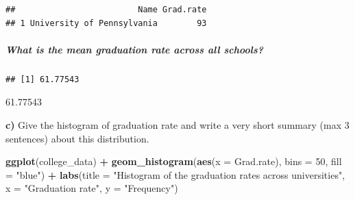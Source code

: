 \documentclass[]{article}
\newenvironment{Shaded}{\begin{snugshade}}{\end{snugshade}}
\newcommand{\KeywordTok}[1]{\textcolor[rgb]{0.13,0.29,0.53}{\textbf{#1}}}
\newcommand{\DataTypeTok}[1]{\textcolor[rgb]{0.13,0.29,0.53}{#1}}
\newcommand{\DecValTok}[1]{\textcolor[rgb]{0.00,0.00,0.81}{#1}}
\newcommand{\StringTok}[1]{\textcolor[rgb]{0.31,0.60,0.02}{#1}}
\newcommand{\CommentTok}[1]{\textcolor[rgb]{0.56,0.35,0.01}{\textit{#1}}}
\newcommand{\OperatorTok}[1]{\textcolor[rgb]{0.81,0.36,0.00}{\textbf{#1}}}
\newcommand{\NormalTok}[1]{#1}
\let\oldsubparagraph\subparagraph
\renewcommand{\subparagraph}[1]{\oldsubparagraph{#1}\mbox{}}
\begin{document}
\begin{verbatim}
##                         Name Grad.rate
## 1 University of Pennsylvania        93
\end{verbatim}

\subparagraph{What is the mean graduation rate across all
schools?}\label{what-is-the-mean-graduation-rate-across-all-schools}

\begin{Shaded}
\end{Shaded}

\begin{verbatim}
## [1] 61.77543
\end{verbatim}

\begin{Shaded}
\end{Shaded}

61.77543

\textbf{c)} Give the histogram of graduation rate and write a very short
summary (max 3 sentences) about this distribution.

\begin{Shaded}
\begin{Highlighting}[]
\KeywordTok{ggplot}\NormalTok{(college_data) }\OperatorTok{+}\StringTok{ }\KeywordTok{geom_histogram}\NormalTok{(}\KeywordTok{aes}\NormalTok{(}\DataTypeTok{x =}\NormalTok{ Grad.rate), }\DataTypeTok{bins =} \DecValTok{50}\NormalTok{, }\DataTypeTok{fill =} \StringTok{"blue"}\NormalTok{) }\OperatorTok{+}\StringTok{ }
\StringTok{    }\KeywordTok{labs}\NormalTok{(}\DataTypeTok{title =} \StringTok{"Histogram of the graduation rates across universities"}\NormalTok{, }\DataTypeTok{x =} \StringTok{"Graduation rate"}\NormalTok{, }
        \DataTypeTok{y =} \StringTok{"Frequency"}\NormalTok{)}
\end{Highlighting}
\end{Shaded}
\end{document}

